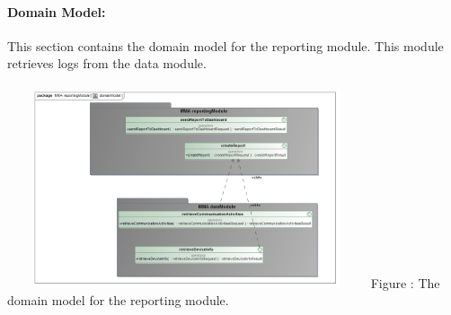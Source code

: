 \documentclass[hidelinks, 12pt, oneside]{article}
\begin{document}
			\paragraph{Domain Model:}
			This section contains the domain model for the reporting module. This module retrieves logs from the data module. \\\\
			\includegraphics[width=400px,height=220px]{img/domainModelReportModule.jpg}
			     Figure : The domain model for the reporting module.\newline
			  
		
\end{document}
